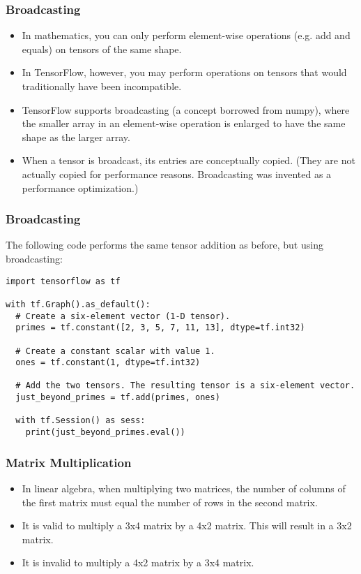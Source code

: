 \begin{frame}[fragile] \frametitle{Broadcasting}
\begin{itemize}
\item In mathematics, you can only perform element-wise operations (e.g. add and equals) on tensors of the same shape.
\item In TensorFlow, however, you may perform operations on tensors that would traditionally have been incompatible. 
\item TensorFlow supports broadcasting (a concept borrowed from numpy), where the smaller array in an element-wise operation is enlarged to have the same shape as the larger array. 
\item  When a tensor is broadcast, its entries are conceptually copied. (They are not actually copied for performance reasons. Broadcasting was invented as a performance optimization.)
\end{itemize}

\end{frame}



\begin{frame}[fragile] \frametitle{Broadcasting}
The following code performs the same tensor addition as before, but using broadcasting:
\begin{lstlisting}
import tensorflow as tf

with tf.Graph().as_default():
  # Create a six-element vector (1-D tensor).
  primes = tf.constant([2, 3, 5, 7, 11, 13], dtype=tf.int32)

  # Create a constant scalar with value 1.
  ones = tf.constant(1, dtype=tf.int32)

  # Add the two tensors. The resulting tensor is a six-element vector.
  just_beyond_primes = tf.add(primes, ones)

  with tf.Session() as sess:
    print(just_beyond_primes.eval())
\end{lstlisting}

\end{frame}

\begin{frame}[fragile] \frametitle{Matrix Multiplication}
\begin{itemize}
\item In linear algebra, when multiplying two matrices, the number of columns of the first matrix must equal the number of rows in the second matrix.
\item 
It is valid to multiply a 3x4 matrix by a 4x2 matrix. This will result in a 3x2 matrix.
\item  It is invalid to multiply a 4x2 matrix by a 3x4 matrix.
\end{itemize}
\end{frame}

